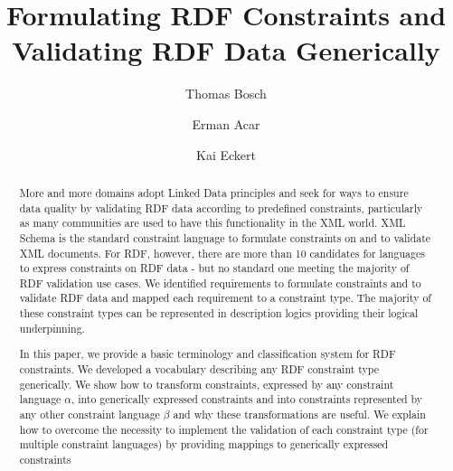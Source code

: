 \documentclass{llncs}
\newcommand{\ms}[1]{\texttt{#1}}
\begin{document}
%
%
\title{Formulating RDF Constraints and \\ Validating RDF Data Generically}
%
%
\author{Thomas Bosch \and Erman Acar \and Kai Eckert}
%
%

\maketitle              %

\begin{abstract}

More and more domains adopt Linked Data principles
and seek for ways to ensure data quality by validating RDF data according to predefined constraints, 
particularly as many communities are used to have this functionality in the XML world.
XML Schema is the standard constraint language to formulate constraints on and to validate XML documents.
For RDF, however, there are more than 10 candidates for languages to express constraints on RDF data - but no standard one meeting the majority of RDF validation use cases.
We identified requirements to formulate constraints and to validate RDF data and mapped each requirement to a constraint type.
The majority of these constraint types can be represented in description logics providing their logical underpinning.

In this paper, we provide a basic terminology and classification system for RDF constraints.
We developed a vocabulary describing any RDF constraint type generically. 
We show how to transform constraints, expressed by any constraint language \ms{$\alpha$}, into generically expressed constraints and into constraints represented by any other constraint language \ms{$\beta$} and why these transformations are useful.
We explain how to overcome the necessity to implement the validation of each constraint type (for multiple constraint languages) by providing mappings to generically expressed constraints 

\end{abstract}
%
\end{document}
